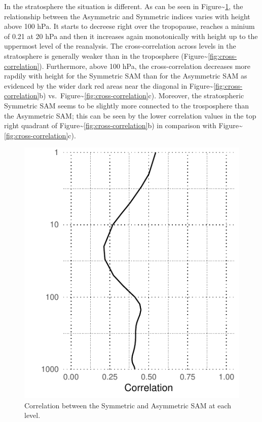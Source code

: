 \documentclass[]{ametsocV5}
\begin{document}
In the stratosphere the situation is different. As can be seen in
Figure\textasciitilde{}\ref{fig:cor-lev}, the relationship between the
Asymmetric and Symmetric indices varies with height above 100 hPa. It
starts to decreese right over the tropopause, reaches a minium of 0.21
at 20 hPa and then it increases again monotonically with height up to
the uppermost level of the reanalysis. The cross-correlation across
levels in the stratosphere is generally weaker than in the troposphere
(Figure\textasciitilde{}\ref{fig:cross-correlation}). Furthermore, above
100 hPa, the cross-correlation decreases more rapdily with height for
the Symmetric SAM than for the Asymmetric SAM as evidenced by the wider
dark red areas near the diagonal in
Figure\textasciitilde{}\ref{fig:cross-correlation}b)
vs.~Figure\textasciitilde{}\ref{fig:cross-correlation}c). Moreover, the
stratospheric Symmetric SAM seems to be slightly more connected to the
trosposphere than the Asymmetric SAM; this can be seen by the lower
correlation values in the top right quadrant of
Figure\textasciitilde{}\ref{fig:cross-correlation}b) in comparison with
Figure\textasciitilde{}\ref{fig:cross-correlation}c).

\begin{figure}
\includegraphics{cor-lev-1} \caption[Correlation between the Symmetric and Asymmetric SAM at each level]{Correlation between the Symmetric and Asymmetric SAM at each level.}\label{fig:cor-lev}
\end{figure}
\end{document}
